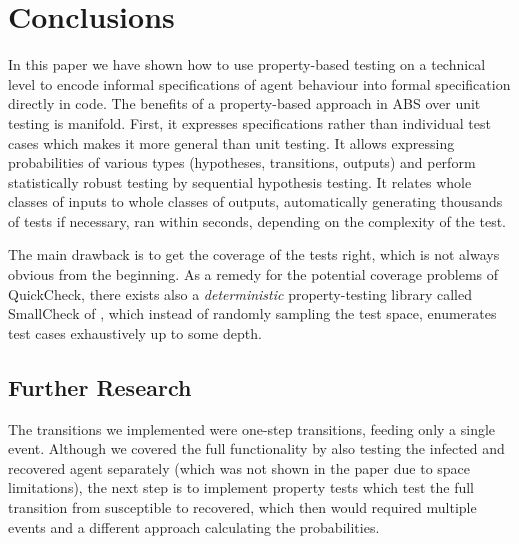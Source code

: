 \section{Conclusions}
\label{sec:conclusions}
In this paper we have shown how to use property-based testing on a technical level to encode informal specifications of agent behaviour into formal specification directly in code. The benefits of a property-based approach in ABS over unit testing is manifold. First, it expresses specifications rather than individual test cases which makes it more general than unit testing. It allows expressing probabilities of various types (hypotheses, transitions, outputs) and perform statistically robust testing by sequential hypothesis testing. It relates whole classes of inputs to whole classes of outputs, automatically generating thousands of tests if necessary, ran within seconds, depending on the complexity of the test. 

The main drawback is to get the coverage of the tests right, which is not always obvious from the beginning. As a remedy for the potential coverage problems of QuickCheck, there exists also a \textit{deterministic} property-testing library called SmallCheck of \cite{runciman_smallcheck_2008}, which instead of randomly sampling the test space, enumerates test cases exhaustively up to some depth.


\subsection{Further Research}
The transitions we implemented were one-step transitions, feeding only a single event. Although we covered the full functionality by also testing the infected and recovered agent separately (which was not shown in the paper due to space limitations), the next step is to implement property tests which test the full transition from susceptible to recovered, which then would required multiple events and a different approach calculating the probabilities.
